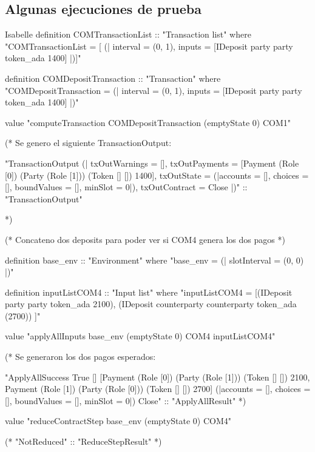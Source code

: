 \documentclass[12pt]{book}
\begin{document}
\subsection{Algunas ejecuciones de prueba}


\begin{code}[title=Algunas ejecuciones al contrato COM.]{Isabelle}
definition COMTransactionList :: "Transaction list" where
"COMTransactionList  = [ (| interval = (0, 1), 
                            inputs = [IDeposit party party token_ada 1400] 
                         |)]"

definition COMDepositTransaction :: "Transaction" where
"COMDepositTransaction = (| interval = (0, 1),
                            inputs = [IDeposit party party token_ada 1400]
                          |)"

value "computeTransaction COMDepositTransaction (emptyState 0) COM1"

(* Se genero el siguiente TransactionOutput:

"TransactionOutput
  (| txOutWarnings = [], 
     txOutPayments = [Payment 
                        (Role [0]) (Party (Role [1])) (Token [] []) 1400],
     txOutState = (|accounts = [], 
                    choices = [], 
                    boundValues = [], 
                    minSlot = 0|),
     txOutContract = Close |)"
  :: "TransactionOutput"

*)

(* Concateno dos deposits para poder ver si COM4 genera los dos pagos *)

definition base_env :: "Environment" where
"base_env = (| slotInterval = (0, 0) |)"

definition inputListCOM4 :: "Input list" where
"inputListCOM4 = [(IDeposit party party token_ada 2100),
              (IDeposit counterparty counterparty token_ada (2700))
             ]"

value "applyAllInputs base_env (emptyState 0) COM4 inputListCOM4"

(* Se generaron los dos pagos esperados:

"ApplyAllSuccess True []
  [Payment (Role [0]) (Party (Role [1])) (Token [] []) 2100,
   Payment (Role [1]) (Party (Role [0])) (Token [] []) 2700]
  (|accounts = [], choices = [], boundValues = [], minSlot = 0|) Close"
  :: "ApplyAllResult"
*)

value "reduceContractStep base_env (emptyState 0) COM4"

(*
"NotReduced"
  :: "ReduceStepResult"
*)
\end{code}
\end{document}
